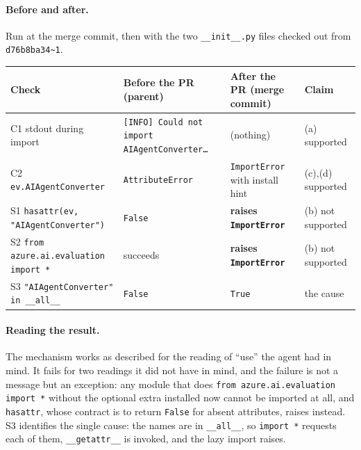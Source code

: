 \documentclass[11pt,a4paper]{article}
\newcommand{\code}[1]{\texttt{#1}}
\begin{document}
\paragraph{Before and after.} Run at the merge commit, then with the two \code{\_\_init\_\_.py} files checked out from \code{d76b8ba34\textasciitilde1}.
\begin{center}\small
\begin{tabularx}{\textwidth}{l X X l}
\toprule
Check & Before the PR (parent) & After the PR (merge commit) & Claim \\
\midrule
C1 stdout during import & \code{[INFO] Could not import AIAgentConverter\ldots} & (nothing) & (a) supported \\
C2 \code{ev.AIAgentConverter} & \code{AttributeError} & \code{ImportError} with install hint & (c),(d) supported \\
S1 \code{hasattr(ev, "AIAgentConverter")} & \code{False} & \textbf{raises \code{ImportError}} & (b) not supported \\
S2 \code{from azure.ai.evaluation import *} & succeeds & \textbf{raises \code{ImportError}} & (b) not supported \\
S3 \code{"AIAgentConverter" in \_\_all\_\_} & \code{False} & \code{True} & the cause \\
\bottomrule
\end{tabularx}
\end{center}

\paragraph{Reading the result.} The mechanism works as described for the reading of ``use'' the agent had in mind. It fails for two readings it did not have in mind, and the failure is not a message but an exception: any module that does \code{from azure.ai.evaluation import *} without the optional extra installed now cannot be imported at all, and \code{hasattr}, whose contract is to return \code{False} for absent attributes, raises instead. S3 identifies the single cause: the names are in \code{\_\_all\_\_}, so \code{import *} requests each of them, \code{\_\_getattr\_\_} is invoked, and the lazy import raises.
\end{document}
